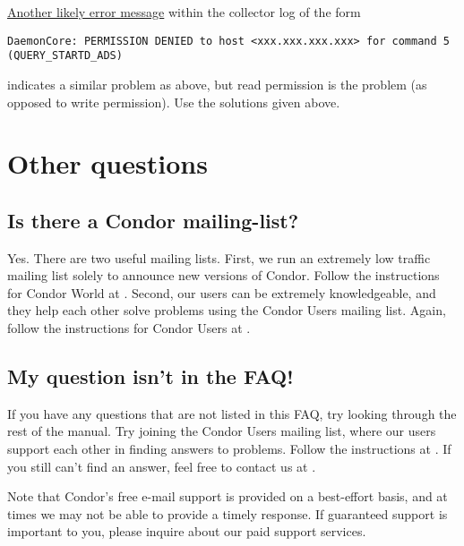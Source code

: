 \underline{Another likely error message} within the collector log of the form
\footnotesize
\begin{verbatim}
DaemonCore: PERMISSION DENIED to host <xxx.xxx.xxx.xxx> for command 5 (QUERY_STARTD_ADS)
\end{verbatim}
\normalsize
indicates a similar problem as above, but read permission
is the problem (as opposed to write permission).
Use the solutions given above.

\section{Other questions}


\subsection*{Is there a Condor mailing-list?}

Yes. There are two useful mailing lists.
First, we run an extremely low traffic mailing list solely to announce new
versions of Condor.
Follow the instructions for Condor World at
.
Second, our users can be extremely knowledgeable,
and they help each other solve problems
using the Condor Users mailing list.
Again, follow the instructions for Condor Users at
.



\subsection*{My question isn't in the FAQ!}

If you have any questions that are not listed in this FAQ, try looking
through the rest of the manual.
Try joining the Condor Users mailing list, where our users
support each other in finding answers to problems.
Follow the instructions at
.
If you still can't find an answer, feel free to contact us at
.

Note that Condor's free e-mail support is provided on a best-effort
basis, and at times we may not be able to provide a timely response.
If guaranteed support is important to you, please inquire about our
paid support services.



